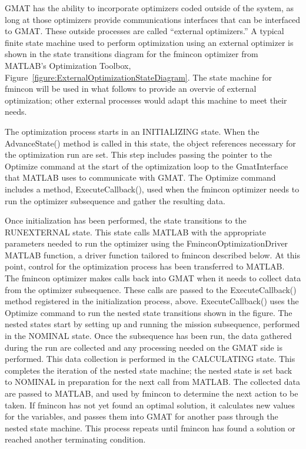 GMAT has the ability to incorporate optimizers coded outside of the system, as long at those
optimizers provide communications interfaces that can be interfaced to GMAT.  These outside
processes are called ``external optimizers.''  A typical finite state machine used to perform
optimization using an external optimizer is shown in the state transitions diagram for the fmincon
optimizer from MATLAB's Optimization Toolbox, Figure~\ref{figure:ExternalOptimizationStateDiagram}.
The state machine for fmincon will be used in what follows to provide an overvie of external
optimization; other external processes would adapt this machine to meet their needs.

The optimization process starts in an INITIALIZING state. When the AdvanceState() method is called
in this state, the object references necessary for the optimization run are set.  This step includes
passing the pointer to the Optimize command at the start of the optimization loop to the
GmatInterface that MATLAB uses to communicate with GMAT.  The Optimize command includes a method,
ExecuteCallback(), used when the fmincon optimizer needs to run the optimizer subsequence and gather
the resulting data.

Once initialization has been performed, the state transitions to the RUNEXTERNAL state. This state
calls MATLAB with the appropriate parameters needed to run the optimizer using the
FminconOptimizationDriver MATLAB function, a driver function tailored to fmincon described below.
At this point, control for the optimization process has been transferred to MATLAB.  The fmincon
optimizer makes calls back into GMAT when it needs to collect data from the optimizer subsequence.
These calls are passed to the ExecuteCallback() method registered in the initialization process,
above.  ExecuteCallback() uses the Optimize command to run the nested state transitions shown in the
figure.  The nested states start by setting up and running the mission subsequence, performed in the
NOMINAL state.  Once the subsequence has been run, the data gathered during the run are collected
and any processing needed on the GMAT side is performed.  This data collection is performed in the
CALCULATING state.  This completes the iteration of the nested state machine; the nested state is
set back to NOMINAL in preparation for the next call from MATLAB.  The collected data are passed to
MATLAB, and used by fmincon to determine the next action to be taken.  If fmincon has not yet found
an optimal solution, it calculates new values for the variables, and passes them into GMAT for
another pass through the nested state machine.  This process repeats until fmincon has found a
solution or reached another terminating condition.

